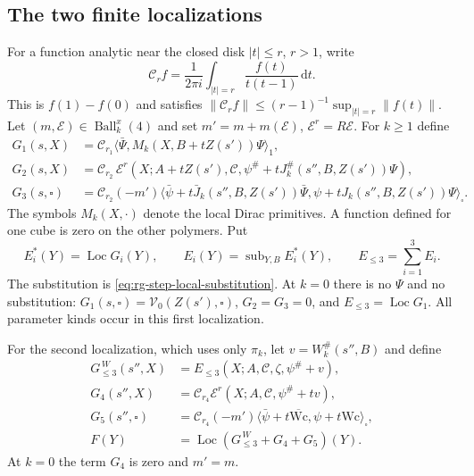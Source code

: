 \documentclass[11pt,letterpaper,reqno]{amsart}
\newcommand{\dd}{\mathrm d}
\begin{document}
\subsection{The two finite localizations}
\label{subsec:rgnl-finite-localizations}

For a function analytic near the closed disk $|t|\le r$, $r>1$,
write
\[
 \mathcal C_rf=\frac1{2\pi i}\int_{|t|=r}
                                      \frac{f(t)}{t(t-1)}\,\dd t .
\]
This is $f(1)-f(0)$ and satisfies
$\|\mathcal C_rf\|\le(r-1)^{-1}\sup_{|t|=r}\|f(t)\|$.
Let $(m,\mathscr E)\in\operatorname{Ball}_k^x(4)$ and set
$m'=m+m(\mathscr E)$, $\mathscr E^r=R\mathscr E$.
For $k\ge1$ define
\begin{align}
 G_1(s,X)&=\mathcal C_{r_1}
                \langle\bar\Psi,M_k(X,B+tZ(s'))\Psi\rangle_1,
                                      \label{eq:rgnl-G1}\\
 G_2(s,X)&=\mathcal C_{r_2}\,
       \mathscr E^r(X;A+tZ(s'),\mathscr C,
                    \psi^\#+tJ_k^\#(s'',B,Z(s'))\Psi),
                                      \label{eq:rgnl-G2}\\
 G_3(s,\square)&=\mathcal C_{r_2}(-m')
       \langle\bar\psi+t\bar J_k(s'',B,Z(s'))\bar\Psi,
                         \psi+tJ_k(s'',B,Z(s'))\Psi\rangle_\square .
                                      \label{eq:rgnl-G3}
\end{align}
The symbols $M_k(X,\cdot)$ denote the local Dirac primitives.
A function defined for one cube is zero on the other polymers.
Put
\[
 E_i^*(Y)=\operatorname{Loc}G_i(Y),\qquad
 E_i(Y)=\operatorname{sub}_{Y,B}E_i^*(Y),\qquad
 E_{\le3}=\sum_{i=1}^3E_i.
\]
The substitution is \eqref{eq:rg-step-local-substitution}.
At $k=0$ there is no $\Psi$ and no substitution:
$G_1(s,\square)=\mathcal V_0(Z(s'),\square)$,
$G_2=G_3=0$, and $E_{\le3}=\operatorname{Loc}G_1$.
All parameter kinds occur in this first localization.

For the second localization, which uses only $\pi_k$, let
$v=W_k^\#(s'',B)$ and define
\begin{align}
 G_{\le3}^{\,W}(s'',X)&=E_{\le3}(X;A,\mathscr C,\zeta,
                                                      \psi^\#+v),
                                      \label{eq:rgnl-GW}\\
 G_4(s'',X)&=\mathcal C_{r_4}
                  \mathscr E^r(X;A,\mathscr C,\psi^\#+tv),\\
 G_5(s'',\square)&=\mathcal C_{r_4}(-m')
                 \langle\bar\psi+t\overline{\mathrm{Wc}},
                                   \psi+t\mathrm{Wc}\rangle_\square,\\
 F(Y)&=\operatorname{Loc}(G_{\le3}^{\,W}+G_4+G_5)(Y).
                                      \label{eq:rgnl-finite-activity}
\end{align}
At $k=0$ the term $G_4$ is zero and $m'=m$.
\end{document}
